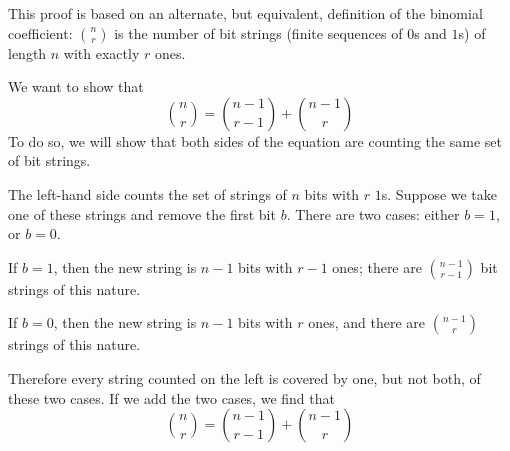 \documentclass{article}
\begin{document}
This proof is based on an alternate, but equivalent, definition of the binomial coefficient: $\binom{n}{r}$ is the number of bit strings (finite sequences of $0$s and $1$s) of length $n$ with exactly $r$ ones.

We want to show that
$$\binom{n}{r} = \binom{n-1}{r-1} + \binom{n-1}{r}$$
To do so, we will show that both sides of the equation are counting the same set of bit strings.

The left-hand side counts the set of strings of $n$ bits with $r$ $1$s.  Suppose we take one of these strings and remove the first bit $b$.  There are two cases: either $b = 1$, or $b = 0$.

If $b = 1$, then the new string is $n-1$ bits with $r-1$ ones; there are $\binom{n-1}{r-1}$ bit strings of this nature.

If $b = 0$, then the new string is $n-1$ bits with $r$ ones, and there are $\binom{n-1}{r}$ strings of this nature.

Therefore every string counted on the left is covered by one, but not both, of these two cases.  If we add the two cases, we find that
$$\binom{n}{r} = \binom{n-1}{r-1} + \binom{n-1}{r}$$
\end{document}
